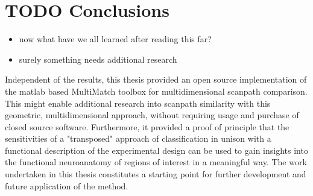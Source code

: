 \documentclass[a4paper, 12pt]{scrreprt}
\begin{document}
\section{TODO Conclusions}
\begin{itemize}
	\item now what have we all learned after reading this far?
	\item surely something needs additional research

\end{itemize}
Independent of the results, this thesis provided an open source implementation of the matlab based MultiMatch toolbox for multidimensional scanpath comparison. This might enable additional research into scanpath similarity with this geometric, multidimensional approach, without requiring usage and purchase of closed source software. \newline Furthermore, it provided a proof of principle that the sensitivities of a "transposed" approach of classification in unison with a functional description of the experimental design can be used to gain insights into the functional neuroanatomy of regions of interest in a meaningful way. The work undertaken in this thesis constitutes a starting point for further development and future application of the method.
\end{document}
